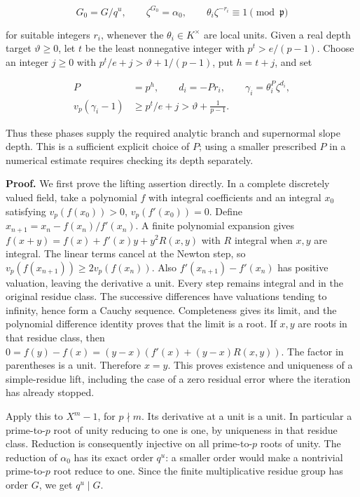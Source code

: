 \documentclass[
  11pt,
  a4paper,
]{article}
\begin{document}
\[
G_0=G/q^u,\qquad
\zeta^{G_0}=\alpha_0,\qquad
\theta_i\zeta^{-r_i}\equiv1\pmod{\mathfrak p}
\tag{10.145}
\]

for suitable integers \(r_i\), whenever the \(\theta_i\in K^\times\) are
local units. Given a real depth target \(\vartheta\ge0\), let \(t\) be
the least nonnegative integer with \(p^t>e/(p-1)\). Choose an integer
\(j\ge0\) with \(p^t/e+j>\vartheta+1/(p-1)\), put \(h=t+j\), and set

\[
\begin{aligned}
P&=p^h,\qquad d_i=-Pr_i,\qquad
\gamma_i=\theta_i^P\zeta^{d_i},\\
v_p(\gamma_i-1)&\ge p^t/e+j>
\vartheta+\frac1{p-1}.
\end{aligned}
\tag{10.146}
\]

Thus these phases supply the required analytic branch and supernormal
slope depth. This is a sufficient explicit choice of \(P\); using a
smaller prescribed \(P\) in a numerical estimate requires checking its
depth separately.

\textbf{Proof.} We first prove the lifting assertion directly. In a
complete discretely valued field, take a polynomial \(f\) with integral
coefficients and an integral \(x_0\) satisfying \(v_p(f(x_0))>0\),
\(v_p(f'(x_0))=0\). Define \(x_{n+1}=x_n-f(x_n)/f'(x_n)\). A finite
polynomial expansion gives \(f(x+y)=f(x)+f'(x)y+y^2R(x,y)\) with \(R\)
integral when \(x,y\) are integral. The linear terms cancel at the
Newton step, so \(v_p(f(x_{n+1}))\ge2v_p(f(x_n))\). Also
\(f'(x_{n+1})-f'(x_n)\) has positive valuation, leaving the derivative a
unit. Every step remains integral and in the original residue class. The
successive differences have valuations tending to infinity, hence form a
Cauchy sequence. Completeness gives its limit, and the polynomial
difference identity proves that the limit is a root. If \(x,y\) are
roots in that residue class, then
\(0=f(y)-f(x)=(y-x)(f'(x)+(y-x)R(x,y))\). The factor in parentheses is a
unit. Therefore \(x=y\). This proves existence and uniqueness of a
simple-residue lift, including the case of a zero residual error where
the iteration has already stopped.

Apply this to \(X^m-1\), for \(p\nmid m\). Its derivative at a unit is a
unit. In particular a prime-to-\(p\) root of unity reducing to one is
one, by uniqueness in that residue class. Reduction is consequently
injective on all prime-to-\(p\) roots of unity. The reduction of
\(\alpha_0\) has its exact order \(q^u\): a smaller order would make a
nontrivial prime-to-\(p\) root reduce to one. Since the finite
multiplicative residue group has order \(G\), we get \(q^u\mid G\).
\end{document}
